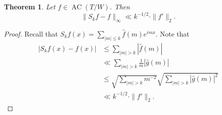 \documentclass{article}
\DeclareMathOperator{\AC}{AC}
\newtheorem{theorem}{Theorem}
\theoremstyle{definition}
\begin{document}
\begin{theorem}
Let $f\in \AC(T/W)$. Then 
\[
	\|S_k f - f\|_\infty \ll k^{-1/2}\cdot \|f'\|_2 .
\]
\end{theorem}
\begin{proof}
Recall that $S_k f(x) = \sum_{|m|\leqslant k} \widehat f(m) e^{i m x}$. Note 
that 
\begin{align*}
	|S_k f(x) - f(x)| 
		&\leqslant \sum_{|m|>k} |\widehat f(m)| \\
		&\ll \sum_{|m|>k} \frac{1}{m} |\widehat g(m)| \\
		&\leqslant \sqrt{\sum_{|m|>k} m^{-2}} \sqrt{\sum_{|m|>k} |\widehat g(m)|^2} \\
		&\ll k^{-1/2}\cdot \|f'\|_2.
\end{align*}
\end{proof}
\end{document}
